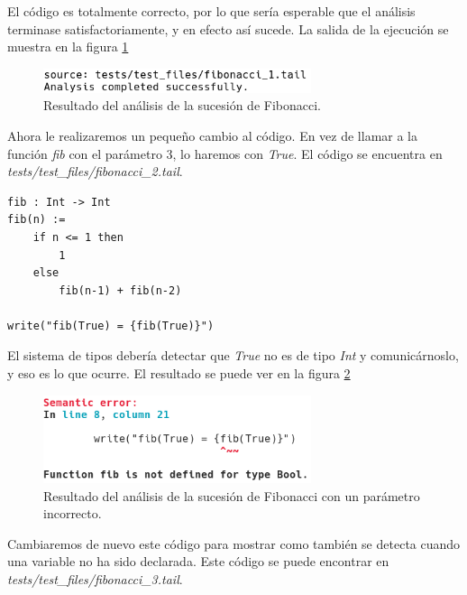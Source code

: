 El código es totalmente correcto, por lo que sería esperable que el análisis terminase satisfactoriamente, y en efecto así sucede. La salida de la ejecución se muestra en la figura \ref{fig:fib1}\\

\begin{figure}[H]
	\begin{center}
		\includegraphics[width=0.7\textwidth]{imagenes/fib1.png}
		\caption{Resultado del análisis de la sucesión de Fibonacci.}
		\label{fig:fib1}
	\end{center}
\end{figure}

Ahora le realizaremos un pequeño cambio al código. En vez de llamar a la función \textit{fib} con el parámetro $3$, lo haremos con \textit{True}. El código se encuentra en \textit{tests/test\_files/fibonacci\_2.tail}.\\

\begin{lstlisting}[style=tail]
fib : Int -> Int
fib(n) :=
	if n <= 1 then
		1
	else
		fib(n-1) + fib(n-2)

write("fib(True) = {fib(True)}")
\end{lstlisting}

El sistema de tipos debería detectar que \textit{True} no es de tipo \textit{Int} y comunicárnoslo, y eso es lo que ocurre. El resultado se puede ver en la figura \ref{fig:fib2}\\

\begin{figure}[H]
	\begin{center}
		\includegraphics[width=0.7\textwidth]{imagenes/fib2.png}
		\caption{Resultado del análisis de la sucesión de Fibonacci con un parámetro incorrecto.}
		\label{fig:fib2}
	\end{center}
\end{figure}

Cambiaremos de nuevo este código para mostrar como también se detecta cuando una variable no ha sido declarada. Este código se puede encontrar en \textit{tests/test\_files/fibonacci\_3.tail}.\\

